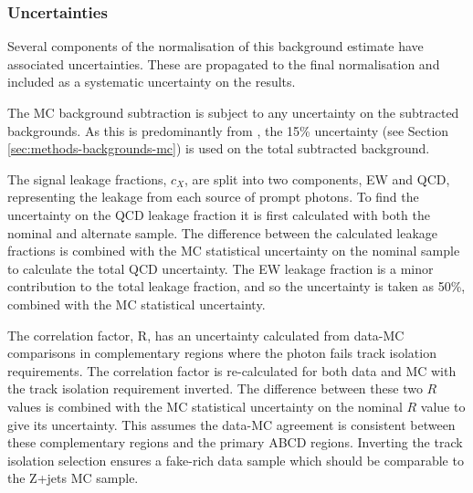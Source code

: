 \subsubsection{Uncertainties}
\label{sec:methods-backgrounds-zjets-uncertainty}

Several components of the normalisation of this background estimate have
associated uncertainties. These are propagated to the final normalisation and
included as a systematic uncertainty on the results.

The \ac{MC} background subtraction is subject to any uncertainty on the
subtracted backgrounds. As this is predominantly from \tty, the 15\% \tty
uncertainty (see Section \ref{sec:methods-backgrounds-mc})
is used on the total subtracted background.

The signal leakage fractions, $c_X$, are split into two components, \ac{EW} and
\ac{QCD}, representing the leakage from each source of prompt photons.  To find
the
uncertainty on the \ac{QCD} leakage fraction it is first calculated with both
the nominal and alternate sample. The difference between the calculated leakage
fractions is combined with the \ac{MC} statistical uncertainty on the nominal
sample to calculate the total \ac{QCD} uncertainty. The \ac{EW} leakage fraction is a
minor contribution to the total leakage fraction, and so the uncertainty is
taken as 50\%, combined with the \ac{MC} statistical uncertainty.

The correlation factor, R, has an uncertainty calculated from data-\ac{MC}
comparisons in complementary regions where the photon fails track isolation
requirements.
The correlation factor is re-calculated for both data and \ac{MC}
with the track isolation requirement inverted. The difference between these two
$R$ values is combined with the \ac{MC} statistical uncertainty on the nominal
$R$ value to give its uncertainty.
This assumes the data-\ac{MC} agreement is consistent between these
complementary regions and the primary ABCD regions. Inverting the track
isolation selection ensures a fake-rich data sample which should be comparable
to the Z+jets \ac{MC} sample.

